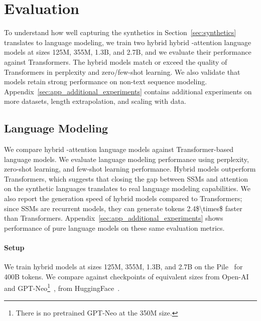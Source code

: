 \section{\hthree Evaluation}
\label{sec:evaluation}





To understand how well capturing the synthetics in Section~\ref{sec:synthetics} translates to language modeling, we train two hybrid hybrid \hthree-attention language models at sizes 125M, 355M, 1.3B, and 2.7B, and we evaluate their performance against Transformers.
The hybrid models match or exceed the quality of Transformers in perplexity and zero/few-shot learning.
We also validate that \hthree models retain strong performance on non-text sequence modeling.
Appendix~\ref{sec:app_additional_experiments} contains additional experiments on more datasets, length extrapolation, and scaling with data.

\subsection{Language Modeling}
\label{subsec:language_modeling}

We compare hybrid \hthree-attention language models against Transformer-based language models.
We evaluate language modeling performance using perplexity, zero-shot learning, and few-shot learning performance.
Hybrid \hthree models outperform Transformers, which suggests that closing the gap between SSMs and attention on the synthetic languages translates to real language modeling capabilities.
We also report the generation speed of hybrid \hthree models compared to Transformers; since SSMs are recurrent models, they can generate tokens \num{2.4$\times$} faster than Transformers.
Appendix~\ref{sec:app_additional_experiments} shows performance of pure \hthree language models on these same evaluation metrics.

\paragraph{Setup}
We train hybrid models at sizes 125M, 355M, 1.3B, and 2.7B on the Pile~\citep{gao2020pile} for 400B tokens.
We compare against checkpoints of equivalent sizes from
Open-AI~\citep{radford2019language} and GPT-Neo\footnote{There
  is no pretrained GPT-Neo at the 350M size.}~\citep{gpt-neo},
from HuggingFace~\citep{wolf-etal-2020-transformers}.


